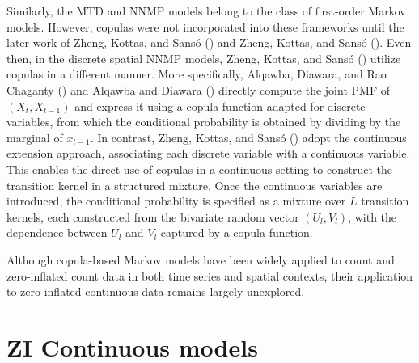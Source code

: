 \documentclass[
  letterpaper,
  double,
  12pt,
  1.0in]{beavtex}
\begin{document}
Similarly, the MTD and NNMP models belong to the class of first-order
Markov models. However, copulas were not incorporated into these
frameworks until the later work of Zheng, Kottas, and Sansó
() and Zheng, Kottas, and Sansó
(). Even then, in the
discrete spatial NNMP models, Zheng, Kottas, and Sansó
() utilize copulas in a
different manner. More specifically, Alqawba, Diawara, and Rao Chaganty
() and Alqawba and Diawara
() directly compute the joint PMF
of \((X_t, X_{t-1})\) and express it using a copula function adapted for
discrete variables, from which the conditional probability is obtained
by dividing by the marginal of \(x_{t-1}\). In contrast, Zheng, Kottas,
and Sansó () adopt the
continuous extension approach, associating each discrete variable with a
continuous variable. This enables the direct use of copulas in a
continuous setting to construct the transition kernel in a structured
mixture. Once the continuous variables are introduced, the conditional
probability is specified as a mixture over \(L\) transition kernels,
each constructed from the bivariate random vector \((U_l, V_l)\), with
the dependence between \(U_l\) and \(V_l\) captured by a copula
function.

Although copula-based Markov models have been widely applied to count
and zero-inflated count data in both time series and spatial contexts,
their application to zero-inflated continuous data remains largely
unexplored.

\section{ZI Continuous models}\label{zi-continuous-models}
\end{document}
